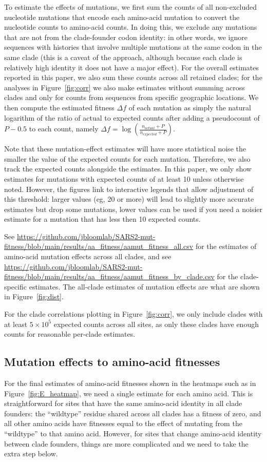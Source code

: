 \documentclass[9pt,twocolumn,twoside]{gsajnl_modified}
\begin{document}
{To estimate the effects of mutations, we first sum the counts of all non-excluded nucleotide mutations that encode each amino-acid mutation to convert the nucleotide counts to amino-acid counts.
In doing this, we exclude any mutations that are not from the clade-founder codon identity: in other words, we ignore sequences with histories that involve multiple mutations at the same codon in the same clade (this is a caveat of the approach, although because each clade is relatively high identity it does not have a major effect).
For the overall estimates reported in this paper, we also sum these counts across all retained clades; for the analyses in Figure~\ref{fig:corr} we also make estimates without summing across clades and only for counts from sequences from specific geographic locations.
We then compute the estimated fitness $\Delta f$ of each mutation as simply the natural logarithm of the ratio of actual to expected counts after adding a pseudocount of $P - 0.5$ to each count, namely $ \Delta f = \log \left(\frac{n_{actual} + P}{n_{expected} + P}\right)$.

Note that these mutation-effect estimates will have more statistical noise the smaller the value of the expected counts for each mutation.
Therefore, we also track the expected counts alongside the estimates.
In this paper, we only show estimates for mutations with expected counts of at least 10 unless otherwise noted.
However, the figures link to interactive legends that allow adjustment of this threshold: larger values (eg, 20 or more) will lead to slightly more accurate estimates but drop some mutations, lower values can be used if you need a noisier estimate for a mutation that has less then 10 expected counts.

See \url{https://github.com/jbloomlab/SARS2-mut-fitness/blob/main/results/aa_fitness/aamut_fitness_all.csv} for the estimates of amino-acid mutation effects across all clades, and see \url{https://github.com/jbloomlab/SARS2-mut-fitness/blob/main/results/aa_fitness/aamut_fitness_by_clade.csv} for the clade-specific estimates.
The all-clade estimates of mutation effects are what are shown in Figure~\ref{fig:dist}.

For the clade correlations plotting in Figure~\ref{fig:corr}, we only include clades with at least $5 \times 10^5$ expected counts across all sites, as only these clades have enough counts for reasonable per-clade estimates.

\subsection{Mutation effects to amino-acid fitnesses}
For the final estimates of amino-acid fitnesses shown in the heatmaps such as in Figure~\ref{fig:E_heatmap}, we need a single estimate for each amino acid.
This is straightforward for sites that have the same amino-acid identity in all clade founders: the ``wildtype'' residue shared across all clades has a fitness of zero, and all other amino acids have fitnesses equal to the effect of mutating from the ``wildtype'' to that amino acid.
However, for sites that change amino-acid identity between clade founders, things are more complicated and we need to take the extra step below.

}
\end{document}
